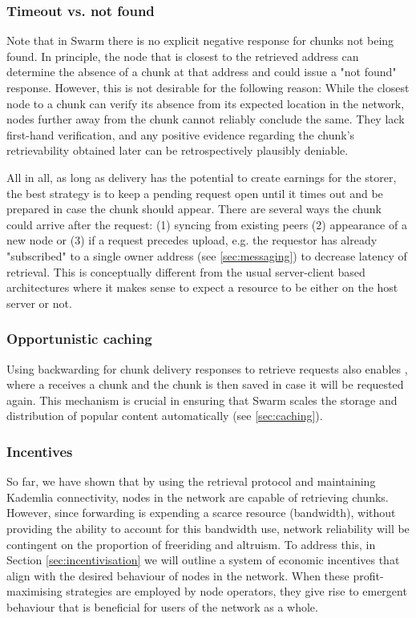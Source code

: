 \subsubsection{Timeout vs. not found}

Note that in Swarm there is no explicit negative response for chunks not being found. In principle, the node that is closest to the retrieved address can determine the absence of a chunk at that address and could issue a "not found" response. However, this is not desirable for the following reason: While the closest node to a chunk can verify its absence from its expected location in the network, nodes further away from the chunk cannot reliably conclude the same. They lack first-hand verification, and any positive evidence regarding the chunk's retrievability obtained later can be retrospectively plausibly deniable. 

All in all, as long as delivery has the potential to create earnings for the storer, the best strategy is to keep a pending request open until it times out and be prepared in case the chunk should appear. There are several ways the chunk could arrive after the request: (1) syncing from existing peers (2) appearance of a new node or (3) if a request precedes upload, e.g. the requestor has already "subscribed" to a single owner address (see \ref{sec:messaging}) to decrease latency of retrieval. This is conceptually different from the usual server-client based architectures where it makes sense to expect a resource to be either on the host server or not. 
 

\subsubsection{Opportunistic caching}

Using backwarding for chunk delivery responses to retrieve requests also enables , where a  receives a chunk and the chunk is then saved in case it will be requested again. This mechanism is crucial in ensuring that Swarm scales the storage and distribution of popular content automatically (see \ref{sec:caching}).

\subsubsection{Incentives}

So far, we have shown that by using the retrieval protocol and maintaining Kademlia connectivity, nodes in the network are capable of retrieving chunks. However, since forwarding is expending a scarce resource (bandwidth), without providing the ability to account for this bandwidth use, network reliability will be contingent on the proportion of freeriding and altruism. To address this, in Section \ref{sec:incentivisation} we will outline a system of economic incentives that align with the desired behaviour of nodes in the network. When these profit-maximising strategies are employed by node operators, they give rise to emergent behaviour that is beneficial for users of the network as a whole.
 
